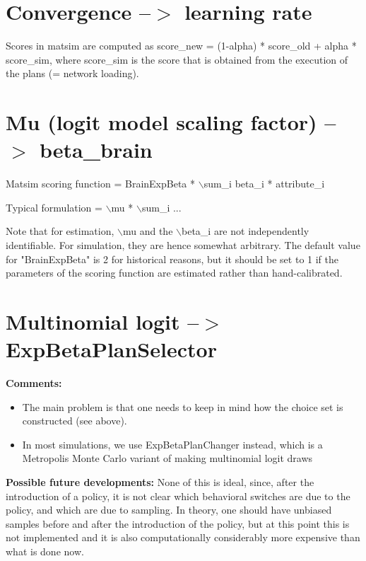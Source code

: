 \vfill\eject
\section{Convergence --$>$ learning rate}

Scores in matsim are computed as score\_new = (1-alpha) * score\_old +   alpha * score\_sim, where score\_sim is the score that is obtained from   the execution of the plans (= network loading).

\vfill\eject
\section{Mu (logit model scaling factor) --$>$ beta\_brain}


Matsim scoring function = BrainExpBeta * $\backslash$sum\_i beta\_i * attribute\_i

Typical formulation = $\backslash$mu * $\backslash$sum\_i ...

Note that for estimation, $\backslash$mu and the $\backslash$beta\_i are not independently  identifiable. For simulation, they are hence somewhat arbitrary. The  default value for "BrainExpBeta" is 2 for historical reasons, but it  should be set to 1 if the parameters of the scoring function are  estimated rather than hand-calibrated.

\vfill\eject
\section{Multinomial logit --$>$ ExpBetaPlanSelector}


\textbf{Comments:}
\begin{itemize}
	\item The main problem is that one needs to keep in mind how the choice set is constructed (see above).
	\item In most simulations, we use ExpBetaPlanChanger instead, which is a   Metropolis Monte Carlo variant of making multinomial logit draws
\end{itemize}

\textbf{Possible future developments:} None of this is  ideal,  since, after the introduction of a policy, it is not clear which   behavioral switches are due to the policy, and which are due to   sampling. In theory, one should have unbiased samples before and  after  the introduction of the policy, but at this point this is not   implemented and it is also computationally considerably more expensive   than what is done now.

